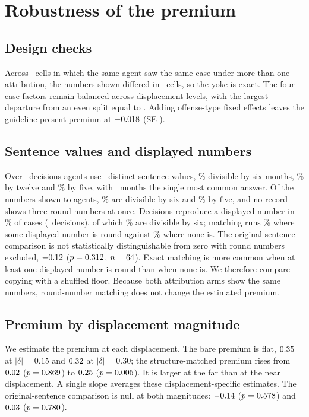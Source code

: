 \section{Robustness of the premium}
\label{app:robust}

\subsection{Design checks}
Across \yokedCells\ cells in which the same agent saw the same case under more than one
attribution, the numbers shown differed in \yokedMismatch\ cells, so the yoke is exact. The four
case factors remain balanced across displacement levels, with the largest departure from an even
split equal to \worstImbalance. Adding offense-type fixed effects leaves the guideline-present
premium at $-0.018$ (SE \rbGTypese).

\subsection{Sentence values and displayed numbers}
Over \rbSentN\ decisions agents use \rbDistinct\ distinct sentence values, \rbDivSix\% divisible by
six months, \rbDivTwelve\% by twelve and \rbDivFive\% by five, with \rbMode\ months the single most
common answer. Of the numbers shown to agents, \rbAncSix\% are divisible by six and \rbAncFive\% by
five, and no record shows three round numbers at once. Decisions reproduce a displayed number in
\rbExact\% of cases (\rbExactN\ decisions), of which \rbExactRound\% are divisible by six; matching
runs \rbMatchRound\% where some displayed number is round against \rbMatchPlain\% where none is.
The original-sentence comparison is not statistically distinguishable from zero with round numbers
excluded, $-0.12$ ($p=0.312$, $n=64$). Exact matching is more common when at least one
displayed number is round than when none is. We therefore compare copying with a shuffled floor.
Because both attribution arms show the same numbers, round-number matching does not change the
estimated premium.

\subsection{Premium by displacement magnitude}
We estimate the premium at each displacement. The bare premium is flat, $0.35$ at
$|\delta|=0.15$ and $0.32$ at $|\delta|=0.30$; the structure-matched premium rises from
$0.02$ ($p=0.869$) to $0.25$ ($p=0.005$). It is larger at the far than at
the near displacement. A single slope averages these displacement-specific estimates.
The original-sentence comparison is null at both magnitudes: $-0.14$
($p=0.578$) and $0.03$ ($p=0.780$).

